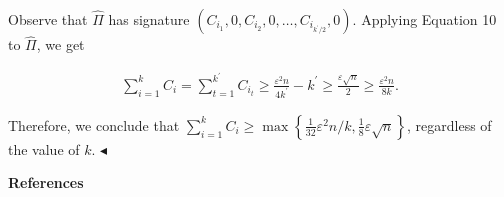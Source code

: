 \begin{itemize}
\begin{itemize}
Observe that $\widehat{\Pi}$ has signature $(C_{i_{1}},0,C_{i_{2}},0,\dots,C_{i_{k^{\prime}/2}},0)$.
Applying Equation 10 to $\widehat{\Pi}$,
we get\par


\[\begin{gathered}
\sum_{i=1}^{k}C_{i}=\sum_{t=1}^{k^{\prime}}C_{i_{t}}\geq\frac{\varepsilon^{2}n}{4k^{\prime}}-k^{\prime}\geq\frac{\varepsilon\sqrt{n}}{2}\geq\frac{\varepsilon^{2}n}{8k}.
\end{gathered}\]





\end{itemize}





\end{itemize}


Therefore, we conclude that
$\sum_{i=1}^{k}C_{i}\geq\max\left\{\frac{1}{32}\varepsilon^{2}n/k,\frac{1}{8}\varepsilon\sqrt{n}\right\}$, regardless of the value of $k$.
$\blacktriangleleft$\par







\par\medskip\noindent\textbf{References}\par



